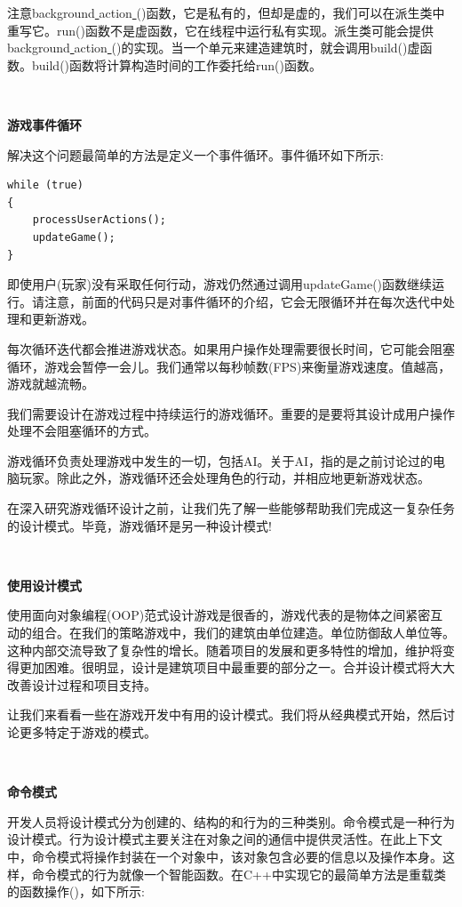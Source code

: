 注意background\underline{ }action\underline{ }()函数，它是私有的，但却是虚的，我们可以在派生类中重写它。run()函数不是虚函数，它在线程中运行私有实现。派生类可能会提供background\underline{ }action\underline{ }()的实现。当一个单元来建造建筑时，就会调用build()虚函数。build()函数将计算构造时间的工作委托给run()函数。 \par

\noindent\textbf{}\ \par
\textbf{游戏事件循环} \ \par
解决这个问题最简单的方法是定义一个事件循环。事件循环如下所示: \par

\begin{lstlisting}[caption={}]
while (true)
{
	processUserActions();
	updateGame();
}
\end{lstlisting}

即使用户(玩家)没有采取任何行动，游戏仍然通过调用updateGame()函数继续运行。请注意，前面的代码只是对事件循环的介绍，它会无限循环并在每次迭代中处理和更新游戏。 \par
每次循环迭代都会推进游戏状态。如果用户操作处理需要很长时间，它可能会阻塞循环，游戏会暂停一会儿。我们通常以每秒帧数(FPS)来衡量游戏速度。值越高，游戏就越流畅。 \par
我们需要设计在游戏过程中持续运行的游戏循环。重要的是要将其设计成用户操作处理不会阻塞循环的方式。 \par
游戏循环负责处理游戏中发生的一切，包括AI。关于AI，指的是之前讨论过的电脑玩家。除此之外，游戏循环还会处理角色的行动，并相应地更新游戏状态。 \par
在深入研究游戏循环设计之前，让我们先了解一些能够帮助我们完成这一复杂任务的设计模式。毕竟，游戏循环是另一种设计模式! \par

\noindent\textbf{}\ \par
\textbf{使用设计模式} \ \par
使用面向对象编程(OOP)范式设计游戏是很香的，游戏代表的是物体之间紧密互动的组合。在我们的策略游戏中，我们的建筑由单位建造。单位防御敌人单位等。这种内部交流导致了复杂性的增长。随着项目的发展和更多特性的增加，维护将变得更加困难。很明显，设计是建筑项目中最重要的部分之一。合并设计模式将大大改善设计过程和项目支持。 \par
让我们来看看一些在游戏开发中有用的设计模式。我们将从经典模式开始，然后讨论更多特定于游戏的模式。 \par

\noindent\textbf{}\ \par
\textbf{命令模式} \ \par
开发人员将设计模式分为创建的、结构的和行为的三种类别。命令模式是一种行为设计模式。行为设计模式主要关注在对象之间的通信中提供灵活性。在此上下文中，命令模式将操作封装在一个对象中，该对象包含必要的信息以及操作本身。这样，命令模式的行为就像一个智能函数。在C++中实现它的最简单方法是重载类的函数操作()，如下所示: \par

